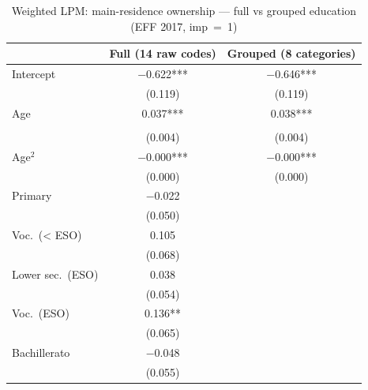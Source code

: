 \begin{table}

\caption{Weighted LPM: main-residence ownership --- full vs grouped education (EFF 2017, imp~=~1)}
\centering
\begin{tabular}[t]{lcc}
\toprule
  & Full (14 raw codes) & Grouped (8 categories)\\
\midrule
Intercept & \num{-0.622}*** & \num{-0.646}***\\
 & (\num{0.119}) & (\num{0.119})\\
Age & \num{0.037}*** & \num{0.038}***\\
\addlinespace[0.3em]
\multicolumn{3}{l}{\textit{Education (ref.: Illiterate)}}\\
\hspace{1em} & (\num{0.004}) & (\num{0.004})\\
\hspace{1em}Age$^2$ & \num{-0.000}*** & \num{-0.000}***\\
\hspace{1em} & (\num{0.000}) & (\num{0.000})\\
\hspace{1em}\hspace{6pt} Primary & \num{-0.022} & \\
\hspace{1em} & (\num{0.050}) & \\
\hspace{1em}\hspace{6pt} Voc.\ (< ESO) & \num{0.105} & \\
\hspace{1em} & (\num{0.068}) & \\
\hspace{1em}\hspace{6pt} Lower sec.\ (ESO) & \num{0.038} & \\
\hspace{1em} & (\num{0.054}) \vphantom{2} & \\
\hspace{1em}\hspace{6pt} Voc.\ (ESO) & \num{0.136}** & \\
\hspace{1em} & (\num{0.065}) & \\
\hspace{1em}\hspace{6pt} Bachillerato & \num{-0.048} & \\
\hspace{1em} & (\num{0.055}) & \\

\end{tabular}
\end{table}
